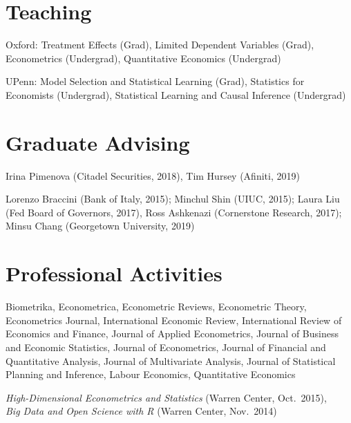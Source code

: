 \documentclass[line,overlapped]{myres}
\begin{document}
\begin{resume}
\section{\sc Teaching }
\vspace{0.5em}
  Oxford: Treatment Effects (Grad), Limited Dependent Variables (Grad), Econometrics (Undergrad), Quantitative Economics (Undergrad)

	UPenn: Model Selection and Statistical Learning (Grad), Statistics for Economists (Undergrad), Statistical Learning and Causal Inference (Undergrad)
	


\section{\sc Graduate Advising}
\begin{description}[style=multiline,leftmargin=3cm,font=\normalfont]
  \item[Main Supervisor:] Irina Pimenova (Citadel Securities, 2018), Tim Hursey (Afiniti, 2019)
  \item[Committee \\ Member:] Lorenzo Braccini (Bank of Italy, 2015); Minchul Shin (UIUC, 2015); Laura Liu (Fed Board of Governors, 2017), Ross Ashkenazi (Cornerstone Research, 2017); Minsu Chang (Georgetown University, 2019)
\end{description}


\section{\sc Professional Activities}

\begin{description}[style=multiline,leftmargin=3cm,font=\normalfont]
  \item[Refereeing:] Biometrika, Econometrica, Econometric Reviews, Econometric Theory, Econometrics Journal, International Economic Review, International Review of Economics and Finance, Journal of Applied Econometrics, Journal of Business and Economic Statistics, Journal of Econometrics, Journal of Financial and Quantitative Analysis, Journal of Multivariate Analysis, Journal of Statistical Planning and Inference, Labour Economics, Quantitative Economics 
  \item[Workshops \\ Organized:]
    \emph{High-Dimensional Econometrics and Statistics} (Warren Center, Oct.\ 2015), \\
    \emph{Big Data and Open Science with R} (Warren Center, Nov.\ 2014)
\end{description}




\end{resume}
\end{document}
